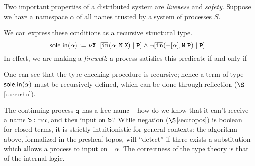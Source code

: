   \begin{example}
    Two important properties of a distributed system are \textit{liveness} and \textit{safety}. Suppose we have a namespace $\alpha$ of all names trusted by a system of processes $S$.

  We can express these conditions as a recursive structural type.
  $$\msf{sole.in}(\alpha) := \nu\X.\; [\ob{\tti}(\alpha,\N.\X)\ttp\PP] \land \neg[\ob{\tti}(\neg[\alpha],\N.\PP)\ttp \PP]$$
  In effect, we are making a \textit{firewall}: a process satisfies this predicate if and only if

   One can see that the type-checking procedure is recursive; hence a term of type $\mathsf{sole.in}(\alpha)$ must be recursively defined, which can be done through reflection ($\S$\ref{ssec:rho}).
  
  The continuing process $\mathtt{q}$ has a free name -- how do we know that it can't receive a name $\mathtt{b}:\neg\alpha$, and then input on $\mathtt{b}$? While negation ($\S$\ref{sec:topos}) is boolean for closed terms, it is strictly intuitionistic for general contexts: the algorithm above, formalized in the presheaf topos, will ``detect'' if there exists a substitution which allows a process to input on $\neg\alpha$.  The correctness of the type theory is that of the internal logic.

  
\end{example}